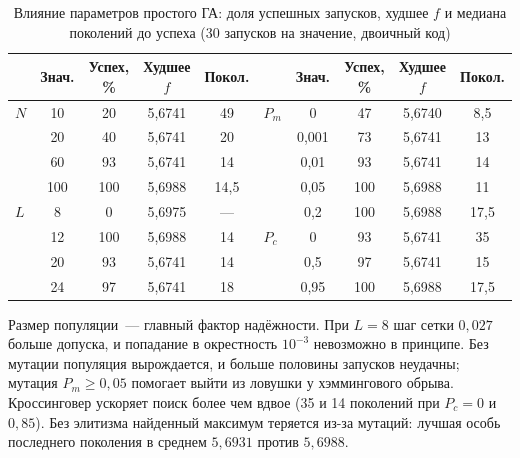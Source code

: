 \begin{table}[!htb]
\caption{Влияние параметров простого ГА: доля успешных запусков, худшее $f$ и медиана поколений до
успеха (30 запусков на значение, двоичный код)}
\label{tab:l5-params}
\centering\small
\begin{tabular}{lcccc|lcccc}
\toprule
 & Знач. & Успех, \% & Худшее $f$ & Покол. & & Знач. & Успех, \% & Худшее $f$ & Покол. \\
\midrule
$N$ & 10  & 20  & 5,6741 & 49   & $P_m$ & 0     & 47  & 5,6740 & 8,5 \\
    & 20  & 40  & 5,6741 & 20   &       & 0,001 & 73  & 5,6741 & 13 \\
    & 60  & 93  & 5,6741 & 14   &       & 0,01  & 93  & 5,6741 & 14 \\
    & 100 & 100 & 5,6988 & 14,5 &       & 0,05  & 100 & 5,6988 & 11 \\
\midrule
$L$ & 8   & 0   & 5,6975 & ---  &       & 0,2   & 100 & 5,6988 & 17,5 \\
    & 12  & 100 & 5,6988 & 14   & $P_c$ & 0     & 93  & 5,6741 & 35 \\
    & 20  & 93  & 5,6741 & 14   &       & 0,5   & 97  & 5,6741 & 15 \\
    & 24  & 97  & 5,6741 & 18   &       & 0,95  & 100 & 5,6988 & 17,5 \\
\bottomrule
\end{tabular}
\end{table}

Размер популяции~--- главный фактор надёжности. При $L = 8$ шаг сетки $0,027$ больше допуска, и
попадание в окрестность $10^{-3}$ невозможно в принципе. Без мутации популяция вырождается, и больше
половины запусков неудачны; мутация $P_m \ge 0,05$ помогает выйти из ловушки у хэммингового обрыва.
Кроссинговер ускоряет поиск более чем вдвое (35 и 14 поколений при $P_c = 0$ и $0,85$). Без
элитизма найденный максимум теряется из-за мутаций: лучшая особь последнего поколения в среднем
$5,6931$ против $5,6988$.

